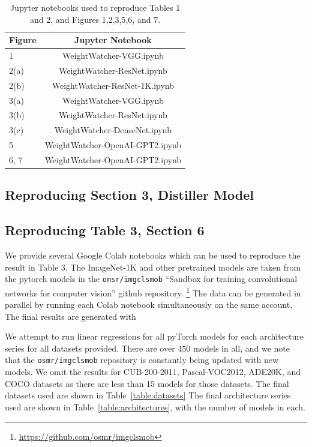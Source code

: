 \begin{table}[t]
\small
\begin{center}
\begin{tabular}{|p{1in}|c|}
\hline
Figure & Jupyter Notebook \\
\hline
1  &  WeightWatcher-VGG.ipynb \\
2(a)  &  WeightWatcher-ResNet.ipynb \\
2(b)  &  WeightWatcher-ResNet-1K.ipynb \\
3(a)  &  WeightWatcher-VGG.ipynb \\
3(b)  &  WeightWatcher-ResNet.ipynb \\
3(c)  &  WeightWatcher-DenseNet.ipynb \\
\hline
5 & WeightWatcher-OpenAI-GPT2.ipynb \\
6, 7 & WeightWatcher-OpenAI-GPT2.ipynb \\
\hline
\end{tabular}
\end{center}
\caption{Jupyter notebooks used to reproduce Tables 1 and 2, and Figures 1,2,3,5,6, and 7.}
\label{table:notebooks}
\end{table}

\subsection{Reproducing Section 3, Distiller Model}


\subsection{Reproducing Table 3, Section 6}

We provide several Google Colab notebooks which can be used to reproduce the result in Table 3.
The ImageNet-1K and other pretrained models are taken from the pytorch models in the \texttt{omsr/imgclsmob} 
``Sandbox for training convolutional networks for computer vision'' github repository.
\footnote{\url{https://github.com/osmr/imgclsmob}}
The data can be generated in parallel by running each Colab notebook simultaneously on the same account,
The final results are generated with 

We attempt to run linear regressions for all pyTorch models for each architecture series for all datasets provided.  
There are over $450$ models in all, and we note that the \texttt{osmr/imgclsmob} repository is constantly being updated with new models.
We omit the results for CUB-200-2011, Pascal-VOC2012, ADE20K, and COCO datasets as there are less than 15 models
for those datasets. The final datasets used are shown in Table~\ref{table:datasets}
The final architecture series used are shown in  Table~\ref{table:architectures}, with the number of models in each.

